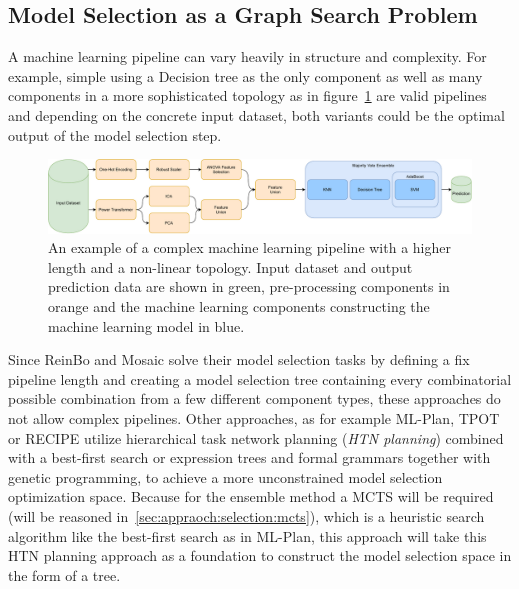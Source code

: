 \subsection{Model Selection as a Graph Search Problem}
\label{sec:appraoch:selection:search}
A machine learning pipeline can vary heavily in structure and complexity.
For example, simple using a Decision tree as the only component as well as many components in a more sophisticated topology as in figure~\ref{fig:appraoch:complex-pipeline} are valid pipelines and depending on the concrete input dataset, both variants could be the optimal output of the model selection step.
\begin{figure}[ht!]
    \centering
    \includegraphics[width=\textwidth]{gfx/Figures/Approach/ComplexPipeline.pdf}
    \caption{An example of a complex machine learning pipeline with a higher length and a non-linear topology. Input dataset and output prediction data are shown in green, pre-processing components in orange and the machine learning components constructing the machine learning model in blue.}
    \label{fig:appraoch:complex-pipeline}
\end{figure}
Since ReinBo and Mosaic solve their model selection tasks by defining a fix pipeline length and creating a model selection tree containing every combinatorial possible combination from a few different component types, these approaches do not allow complex pipelines.\newline
Other approaches, as for example ML-Plan, TPOT or RECIPE utilize hierarchical task network planning (\textit{HTN planning}) combined with a best-first search or expression trees and formal grammars together with genetic programming, to achieve a more unconstrained model selection optimization space.
Because for the ensemble method a MCTS will be required (will be reasoned in~\ref{sec:appraoch:selection:mcts}), which is a heuristic search algorithm like the best-first search as in ML-Plan, this approach will take this HTN planning approach as a foundation to construct the model selection space in the form of a tree.

